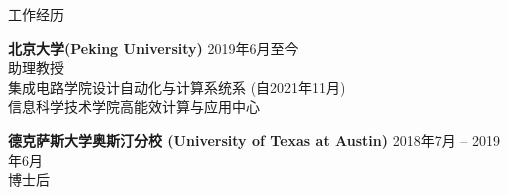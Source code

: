
\begin{rSection}{工作经历}

{\bf 北京大学(Peking University)}                           \hfill {2019年6月至今} \\
助理教授 \\
集成电路学院设计自动化与计算系统系 (自2021年11月) \\
信息科学技术学院高能效计算与应用中心

{\bf 德克萨斯大学奥斯汀分校 (University of Texas at Austin)} \hfill {2018年7月 -- 2019年6月} \\
博士后

%
%
%
%


\end{rSection}


